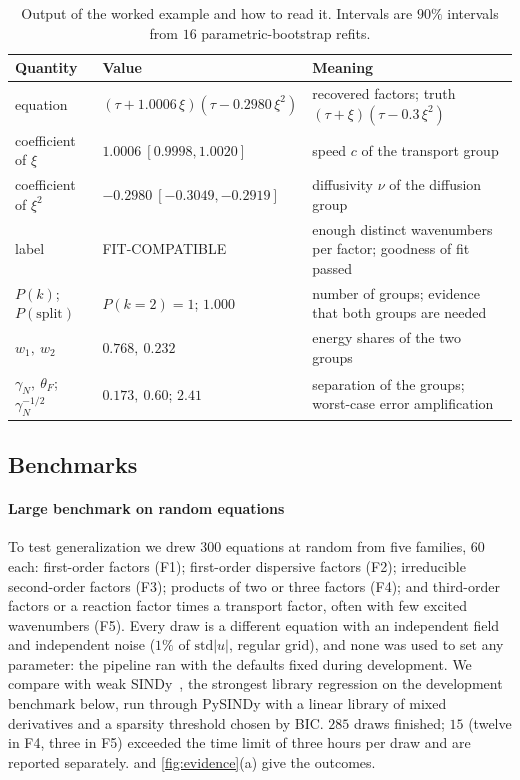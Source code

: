 \documentclass[11pt]{article}
\theoremstyle{plain}
\theoremstyle{definition}
\theoremstyle{remark}
\newcommand{\thetaF}{\theta_{F}}            %
\newcommand{\gN}{\gamma_{N}}                %
\newcommand{\lab}[1]{\textsf{#1}}           %
\newcommand{\FC}{\lab{FIT-COMPATIBLE}}
\newcommand{\abs}[1]{\lvert#1\rvert}
\begin{document}
\begin{table}[tbp]
\centering\small
\caption{Output of the worked example and how to read it. Intervals are $90\%$ intervals from $16$ parametric-bootstrap
refits.}\label{tab:worked}
\begin{tabularx}{\linewidth}{@{}l l X@{}}
\toprule
Quantity & Value & Meaning\\
\midrule
equation & $(\tau+1.0006\,\xi)(\tau-0.2980\,\xi^2)$ & recovered factors; truth $(\tau+\xi)(\tau-0.3\,\xi^2)$\\
coefficient of $\xi$ & $1.0006\ [0.9998,1.0020]$ & speed $c$ of the transport group\\
coefficient of $\xi^2$ & $-0.2980\ [-0.3049,-0.2919]$ & diffusivity $\nu$ of the diffusion group\\
label & \FC & enough distinct wavenumbers per factor; goodness of fit passed\\
$P(k)$; $P(\text{split})$ & $P(k=2)=1$; $1.000$ & number of groups; evidence that both groups are needed\\
$w_1,\ w_2$ & $0.768,\ 0.232$ & energy shares of the two groups\\
$\gN,\ \thetaF$; $\gN^{-1/2}$ & $0.173,\ 0.60$; $2.41$ & separation of the groups; worst-case error amplification\\
\bottomrule
\end{tabularx}
\end{table}

\subsection{Benchmarks}\label{sec:bench}
\paragraph{Large benchmark on random equations} To test generalization we drew $300$ equations at random from five
families, $60$ each: first-order factors (F1); first-order dispersive factors (F2); irreducible
second-order factors (F3); products of two or three factors (F4); and third-order factors or a reaction factor times a
transport factor, often with few excited wavenumbers (F5). Every draw is a different equation with an independent field
and independent noise ($1\%$ of $\mathrm{std}\abs{u}$, regular grid), and none was used to set any parameter: the pipeline
ran with the defaults fixed during development. We compare with weak SINDy~\cite{MesBor21}, the strongest library
regression on the development benchmark below, run through PySINDy with a linear library of mixed derivatives and a
sparsity threshold chosen by BIC. $285$ draws finished; $15$ (twelve in F4, three in F5) exceeded the time limit of three
hours per draw and are reported separately.  and \cref{fig:evidence}(a) give the outcomes.
\end{document}
